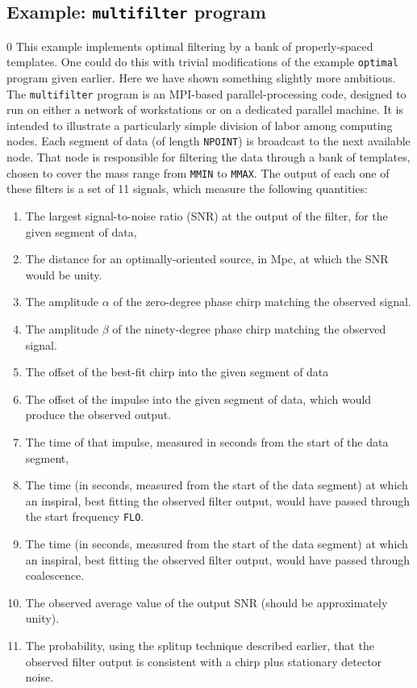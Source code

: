 \subsection{Example: {\tt multifilter} program}
\setcounter{equation}0
This example implements optimal filtering by a bank of properly-spaced templates.
One could do this with trivial modifications of the example {\tt optimal} program
given earlier.  Here we have shown something slightly more ambitious.  The
{\tt multifilter} program is an MPI-based parallel-processing code, designed to run
on either a network of workstations or on a dedicated parallel machine.  It is
intended to illustrate a particularly simple division of labor among
computing nodes.  Each segment of data (of length {\tt NPOINT}) is broadcast
to the next available node.  That node is responsible for filtering the data
through a bank of templates, chosen to cover the mass range from {\tt MMIN}
to {\tt MMAX}.  The output of each one of these filters is a set of 11 signals,
which measure the following quantities:
\begin{enumerate}
\item
The largest signal-to-noise ratio (SNR) at the output of the filter, for the
given segment of data,
\item
The distance for an optimally-oriented source, in Mpc, at which the SNR
would be unity.
\item
The amplitude $\alpha$ of the zero-degree phase chirp matching the observed signal.
\item 
The amplitude $\beta$ of the ninety-degree phase chirp matching the observed signal.
\item
The offset of the best-fit chirp into the given segment of data
\item
The offset of the impulse into the given segment of data, which would
produce the observed output.
\item 
The time of that impulse, measured in seconds from the start of the
data segment,
\item
The time (in seconds, measured from the start of the data segment) at
which an inspiral, best fitting the observed filter output, would have
passed through the start frequency {\tt FLO}.
\item
The time (in seconds, measured from the start of the data segment) at
which an inspiral, best fitting the observed filter output, would have
passed through coalescence.
\item
The observed average value of the output SNR (should be approximately
unity).
\item
The probability, using the splitup technique described earlier, that the
observed filter output is consistent with a chirp plus stationary
detector noise.
\end{enumerate}

